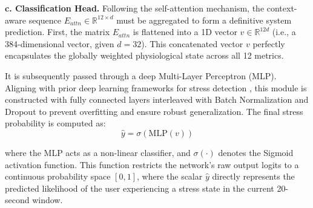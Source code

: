 \documentclass[journal,twoside,web]{ieeecolor}
\begin{document}
\textbf{c. Classification Head.} 
Following the self-attention mechanism, the context-aware sequence $E_{attn} \in \mathbb{R}^{12 \times d}$ must be aggregated to form a definitive system prediction. First, the matrix $E_{attn}$ is flattened into a 1D vector $v \in \mathbb{R}^{12d}$ (i.e., a 384-dimensional vector, given $d=32$). This concatenated vector $v$ perfectly encapsulates the globally weighted physiological state across all 12 metrics. 

It is subsequently passed through a deep Multi-Layer Perceptron (MLP). Aligning with prior deep learning frameworks for stress detection \cite{abd2024deep}, this module is constructed with fully connected layers interleaved with Batch Normalization and Dropout to prevent overfitting and ensure robust generalization. The final stress probability is computed as:
\begin{equation}
\hat{y} = \sigma(\text{MLP}(v))
\end{equation}

where the MLP acts as a non-linear classifier, and $\sigma(\cdot)$ denotes the Sigmoid activation function. This function restricts the network's raw output logits to a continuous probability space $[0, 1]$, where the scalar $\hat{y}$ directly represents the predicted likelihood of the user experiencing a stress state in the current 20-second window.



\end{document}
